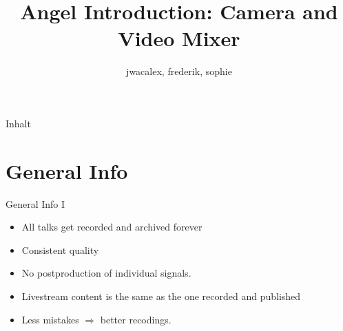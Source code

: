 \documentclass[aspectratio=169]{beamer}
\title{Angel Introduction: Camera and Video Mixer}
\author{jwacalex, frederik, sophie}
\institute{C3VOC}
\begin{document}

\maketitle

\begin{frame}{Inhalt}
\tableofcontents
\end{frame}


\newpage





\section{General Info}
\begin{frame}{General Info I}
	\begin{itemize}
		\item All talks get recorded and archived forever
		\item Consistent quality
		\item No postproduction of individual signals.
		\item Livestream content is the same as the one recorded and published
		\item Less mistakes $\Rightarrow$ better recodings.
	\end{itemize}
\end{frame}
\end{document}
